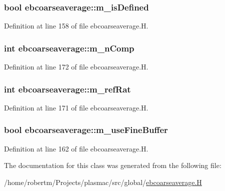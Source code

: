 \subsubsection[{\texorpdfstring{m\+\_\+is\+Defined}{m_isDefined}}]{\setlength{\rightskip}{0pt plus 5cm}bool ebcoarseaverage\+::m\+\_\+is\+Defined\hspace{0.3cm}{\ttfamily [protected]}}\hypertarget{classebcoarseaverage_a80db48bc49eb02c6d7dd169e4bc7400d}{}\label{classebcoarseaverage_a80db48bc49eb02c6d7dd169e4bc7400d}


Definition at line 158 of file ebcoarseaverage.\+H.

\subsubsection[{\texorpdfstring{m\+\_\+n\+Comp}{m_nComp}}]{\setlength{\rightskip}{0pt plus 5cm}int ebcoarseaverage\+::m\+\_\+n\+Comp\hspace{0.3cm}{\ttfamily [protected]}}\hypertarget{classebcoarseaverage_a628edd68230cc8bae2f17f677678b6db}{}\label{classebcoarseaverage_a628edd68230cc8bae2f17f677678b6db}


Definition at line 172 of file ebcoarseaverage.\+H.

\subsubsection[{\texorpdfstring{m\+\_\+ref\+Rat}{m_refRat}}]{\setlength{\rightskip}{0pt plus 5cm}int ebcoarseaverage\+::m\+\_\+ref\+Rat\hspace{0.3cm}{\ttfamily [protected]}}\hypertarget{classebcoarseaverage_a8c01e0a7b7cd67731ef4f98b008f50ca}{}\label{classebcoarseaverage_a8c01e0a7b7cd67731ef4f98b008f50ca}


Definition at line 171 of file ebcoarseaverage.\+H.

\subsubsection[{\texorpdfstring{m\+\_\+use\+Fine\+Buffer}{m_useFineBuffer}}]{\setlength{\rightskip}{0pt plus 5cm}bool ebcoarseaverage\+::m\+\_\+use\+Fine\+Buffer\hspace{0.3cm}{\ttfamily [protected]}}\hypertarget{classebcoarseaverage_aeae7e54b795c68ca2f679cf60a3ea0ea}{}\label{classebcoarseaverage_aeae7e54b795c68ca2f679cf60a3ea0ea}


Definition at line 162 of file ebcoarseaverage.\+H.



The documentation for this class was generated from the following file\+:\begin{DoxyCompactItemize}
\item 
/home/robertm/\+Projects/plasmac/src/global/\hyperlink{ebcoarseaverage_8H}{ebcoarseaverage.\+H}\end{DoxyCompactItemize}
